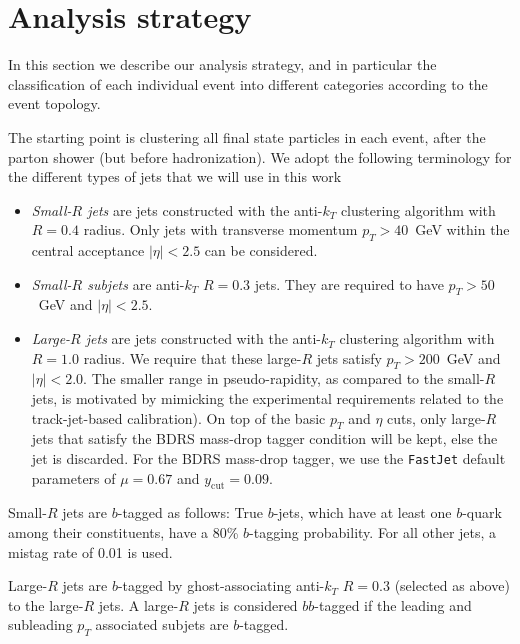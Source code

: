 
\section{Analysis strategy}
\label{sec:analysis}

In this section we describe our analysis strategy, and in particular
the classification of each individual event into
different categories according to the event topology.

The starting point is clustering all final state particles in each
event,  after the parton shower (but before hadronization).
%
We adopt the following terminology for the different types of jets
that we will use in this work
\begin{itemize}
\item {\it Small-$R$ jets} are jets constructed with the
  anti-$k_T$ clustering algorithm with $R=0.4$ radius.
  Only jets with transverse momentum $p_T > 40$~GeV within
  the central acceptance $|\eta|<2.5$ can be considered.

\item {\it Small-$R$ subjets} are anti-$k_T$ $R=0.3$ jets.
%
  They are required to have $p_T > 50$~GeV and $|\eta|<2.5$.

\item {\it Large-$R$ jets}  are jets constructed with the
  anti-$k_T$ clustering algorithm with $R=1.0$ radius.
  We require that these large-$R$ jets satisfy  $p_T > 200$~GeV and
  $|\eta|<2.0$.
  The smaller range in pseudo-rapidity, as compared to the small-$R$ jets,
  is motivated by mimicking the  experimental requirements
  related to the track-jet-based calibration).
  On top of the basic $p_T$ and $\eta$ cuts, only large-$R$ jets
  that satisfy the BDRS mass-drop tagger condition will be kept, else
  the jet is discarded.
  For the BDRS mass-drop tagger, we use the {\tt FastJet} default
  parameters of  $\mu = 0.67$ and $y_{\textrm{cut}}= 0.09$.
  \end{itemize}


Small-$R$ jets are $b$-tagged as follows: True $b$-jets, which have at least one $b$-quark among their constituents, have a 80\% $b$-tagging probability. For all other jets, a mistag rate of 0.01 is used.

Large-$R$ jets are $b$-tagged by ghost-associating anti-$k_T$ $R=0.3$ (selected as above) to the large-$R$ jets. A large-$R$ jets is considered $bb$-tagged if the leading and subleading $p_T$ associated subjets are $b$-tagged.



